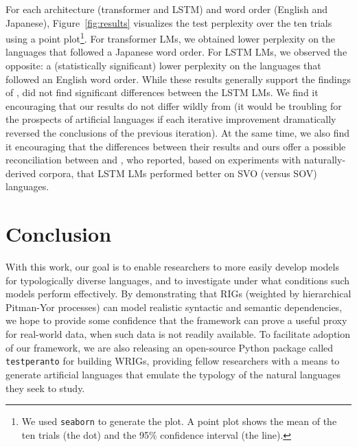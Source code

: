 \documentclass[11pt]{article}
\begin{document}
For each architecture (transformer and LSTM) and word order (English and Japanese), Figure~\ref{fig:results} visualizes the test perplexity over the ten trials using a point plot\footnote{We used \texttt{seaborn} to generate the plot. A point plot shows the mean of the ten trials (the dot) and the 95\% confidence interval (the line).}. For transformer LMs, we obtained lower perplexity on the languages that followed a Japanese word order. For LSTM LMs, we observed the opposite: a (statistically significant) lower perplexity on the languages that followed an English word order. While these results generally support the findings of \citet{white-cotterell-2021-examining}, \citet{white-cotterell-2021-examining} did not find significant differences between the LSTM LMs. We find it encouraging that our results do not differ wildly from \citet{white-cotterell-2021-examining} (it would be troubling for the prospects of artificial languages if each iterative improvement dramatically reversed the conclusions of the previous iteration). At the same time, we also find it encouraging that the differences between their results and ours offer a possible reconciliation between \citet{white-cotterell-2021-examining} and \citet{ravfogel-etal-2019-studying}, who reported, based on experiments with naturally-derived corpora, that LSTM LMs performed better on SVO (versus SOV) languages.




\section{Conclusion}

With this work, our goal is to enable researchers to more easily develop models for typologically diverse languages, and to investigate under what conditions such models perform effectively. By demonstrating that RIGs (weighted by hierarchical Pitman-Yor processes) can model realistic syntactic and semantic dependencies, we hope to provide some confidence that the framework can prove a useful proxy for real-world data, when such data is not readily available. To facilitate adoption of our framework, we are also releasing an open-source Python package called \texttt{testperanto} for building WRIGs, providing fellow researchers with a means to generate artificial languages that emulate the typology of the natural languages they seek to study. 



\end{document}

